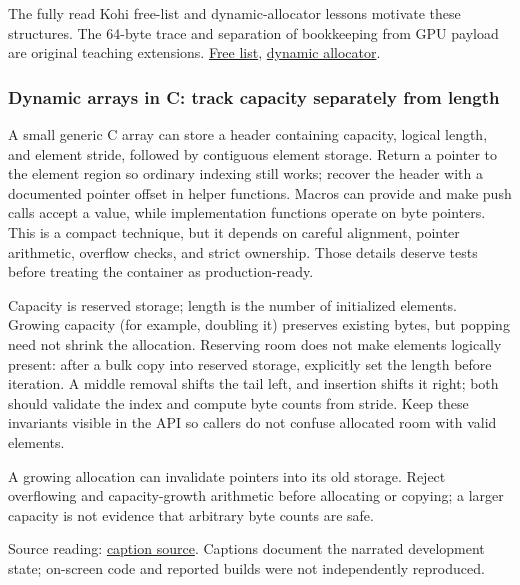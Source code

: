 The fully read Kohi free-list and dynamic-allocator lessons motivate these structures. The 64-byte trace and separation of bookkeeping from GPU payload are original teaching extensions. \href{https://www.youtube.com/watch?v=sP7xRUyP3e0}{Free list}, \href{https://www.youtube.com/watch?v=BSBFBWwG8Ds}{dynamic allocator}.

\subsubsection{Dynamic arrays in C: track capacity separately from length}\label{05-engine-i-ch014-dynamic-arrays-in-c-track-capacity-separately-from-length}

\hypertarget{05-engine-i-ch014-dynamic-arrays-in-c-track-capacity-separately-from-length}{}

A small generic C array can store a header containing capacity, logical length, and element stride, followed by contiguous element storage. Return a pointer to the element region so ordinary indexing still works; recover the header with a documented pointer offset in helper functions. Macros can provide  and make push calls accept a value, while implementation functions operate on byte pointers. This is a compact technique, but it depends on careful alignment, pointer arithmetic, overflow checks, and strict ownership. Those details deserve tests before treating the container as production-ready.

Capacity is reserved storage; length is the number of initialized elements. Growing capacity (for example, doubling it) preserves existing bytes, but popping need not shrink the allocation. Reserving room does not make elements logically present: after a bulk copy into reserved storage, explicitly set the length before iteration. A middle removal shifts the tail left, and insertion shifts it right; both should validate the index and compute byte counts from stride. Keep these invariants visible in the API so callers do not confuse allocated room with valid elements.

A growing allocation can invalidate pointers into its old storage. Reject overflowing  and capacity-growth arithmetic before allocating or copying; a larger capacity is not evidence that arbitrary byte counts are safe.

Source reading: \href{https://www.youtube.com/watch?v=XQ6qljkh2KI}{caption source}. Captions document the narrated development state; on-screen code and reported builds were not independently reproduced.

